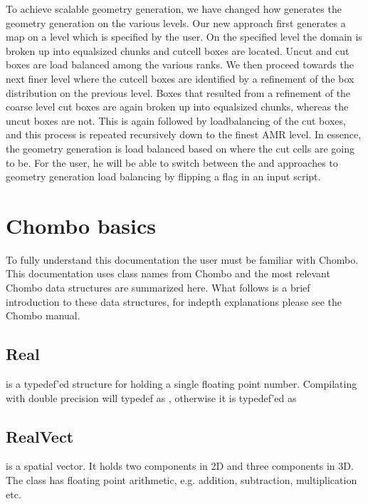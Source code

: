 \documentclass[letterpaper,10pt,english]{sphinxmanual}
\begin{document}
To achieve scalable geometry generation, we have changed how  generates the geometry generation on the various levels.
Our new approach first generates a map on a  level which is specified by the user.
On the specified level the domain is broken up into equal\sphinxhyphen{}sized chunks and cut\sphinxhyphen{}cell boxes are located.
Uncut and cut boxes are load balanced among the various ranks.
We then proceed towards the next finer level where the cut\sphinxhyphen{}cell boxes are identified by a refinement of the box distribution on the previous level.
Boxes that resulted from a refinement of the coarse level cut boxes are again broken up into equal\sphinxhyphen{}sized chunks, whereas the uncut boxes are not.
This is again followed by load\sphinxhyphen{}balancing of the cut boxes, and this process is repeated recursively down to the finest AMR level.
In essence, the geometry generation is load balanced based on where the cut cells are going to be.
For the user, he will be able to switch between the  and  approaches to geometry generation load balancing by flipping a flag in an input script.


\section{Chombo basics}
\label{\detokenize{Basics:chombo-basics}}\label{\detokenize{Basics:chap-basics}}\label{\detokenize{Basics::doc}}
To fully understand this documentation the user must be familiar with Chombo.
This documentation uses class names from Chombo and the most relevant Chombo data structures are summarized here.
What follows is a  brief introduction to these data structures, for in\sphinxhyphen{}depth explanations please see the Chombo manual.


\subsection{Real}
\label{\detokenize{Basics:real}}
 is a typedef’ed structure for holding a single floating point number.
Compilating with double precision will typedef  as , otherwise it is typedef’ed as 


\subsection{RealVect}
\label{\detokenize{Basics:realvect}}
 is a spatial vector.
It holds two  components in 2D and three  components in 3D.
The  class has floating point arithmetic, e.g. addition, subtraction, multiplication etc.
\end{document}
